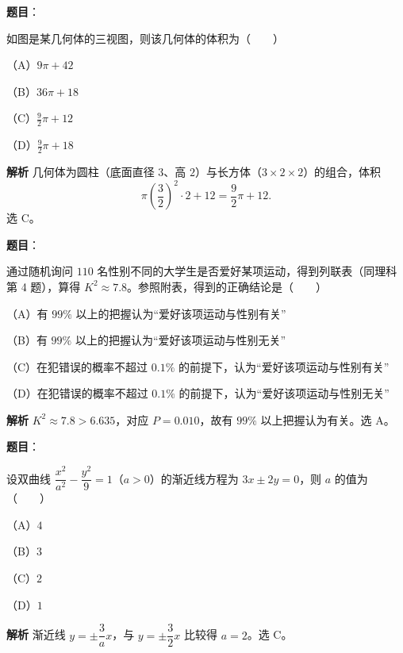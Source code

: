 \begin{answer}

\textbf{题目}：

如图是某几何体的三视图，则该几何体的体积为\mbox{（　　）}

（A）$9\pi+42$

（B）$36\pi+18$

（C）$\frac92\pi+12$

（D）$\frac92\pi+18$
\nopagebreak[4]
\begin{center}\end{center}
\nopagebreak[4]
\textbf{解析}
几何体为圆柱（底面直径 $3$、高 $2$）与长方体（$3\times2\times2$）的组合，体积
\nopagebreak[4]
\[\pi\left(\frac32\right)^2\cdot2+12=\frac92\pi+12.\]
选 C。


\end{answer}
\begin{answer}

\textbf{题目}：

通过随机询问 $110$ 名性别不同的大学生是否爱好某项运动，得到列联表（同理科第 4 题），算得 $K^2\approx7.8$。参照附表，得到的正确结论是\mbox{（　　）}

（A）有 $99\%$ 以上的把握认为“爱好该项运动与性别有关”

（B）有 $99\%$ 以上的把握认为“爱好该项运动与性别无关”

（C）在犯错误的概率不超过 $0.1\%$ 的前提下，认为“爱好该项运动与性别有关”

（D）在犯错误的概率不超过 $0.1\%$ 的前提下，认为“爱好该项运动与性别无关”

\textbf{解析}
$K^2\approx7.8>6.635$，对应 $P=0.010$，故有 $99\%$ 以上把握认为有关。选 A。


\end{answer}
\begin{answer}

\textbf{题目}：

设双曲线 $\dfrac{x^2}{a^2}-\dfrac{y^2}9=1$（$a>0$）的渐近线方程为 $3x\pm2y=0$，则 $a$ 的值为\mbox{（　　）}

（A）$4$

（B）$3$

（C）$2$

（D）$1$

\textbf{解析}
渐近线 $y=\pm\dfrac3a x$，与 $y=\pm\dfrac32x$ 比较得 $a=2$。选 C。


\end{answer}

